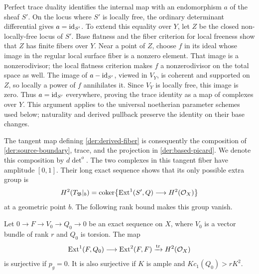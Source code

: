 Perfect trace duality identifies the internal map with an endomorphism
$a$ of the sheaf $S'$. On the locus where $S'$ is locally free, the
ordinary determinant differential gives $a=\operatorname{id}_{S'}$.
To extend this equality over $Y$, let $Z$ be the closed non-locally-free
locus of $S'$. Base flatness and the fiber criterion for local freeness
show that $Z$ has finite fibers over $Y$. Near a point of $Z$, choose
$f$ in its ideal whose image in the regular local surface fiber is a
nonzero element. That image is a nonzerodivisor; the local flatness
criterion makes $f$ a nonzerodivisor on the total space as well.
The image of $a-\operatorname{id}_{S'}$, viewed in $V_Y$, is coherent and supported
on $Z$, so locally a power of $f$ annihilates it. Since $V_Y$ is locally
free, this image is zero. Thus $a=\operatorname{id}_{S'}$ everywhere, proving the
trace identity as a map of complexes over $Y$. This argument applies
to the universal noetherian parameter schemes used below; naturality
and derived pullback preserve the identity on their base changes.

The tangent map defining \eqref{der:derived-fiber} is consequently the
composition of \eqref{der:source-boundary}, trace, and the projection
in \eqref{der:based-picard}.  We denote this composition by $d\det^o$.
The two complexes in this tangent fiber have amplitude $[0,1]$.
Their long exact sequence shows that its only possible extra group is
\[
 H^2(T_{\mathfrak B}|_b)=
 \operatorname{coker}\!\left\{\operatorname{Ext}^1(S',Q)\longrightarrow H^2(\mathcal O_X)\right\}
\]
at a geometric point $b$. The following rank bound makes this group
vanish.

\begin{lemma}
\label{der:trace-surjectivity}
Let $0\to F\to V_0\to Q_0\to0$ be an exact sequence on $X$, where
$V_0$ is a vector bundle of rank $r$ and $Q_0$ is torsion.  The map
\[
\operatorname{Ext}^1(F,Q_0)\longrightarrow\operatorname{Ext}^2(F,F)
\xrightarrow{\operatorname{tr}}H^2(\mathcal O_X)
\]
is surjective if $p_g=0$.  It is also surjective if $K$ is ample and
$Kc_1(Q_0)>rK^2$.
\end{lemma}

